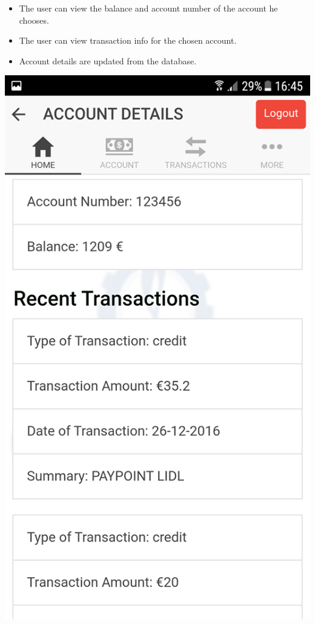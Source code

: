 \begin{itemize}
\begin{enumerate}
\begin{itemize}
                \item The user can view the balance and account number of the account he chooses.
                \item The user can view transaction info for the chosen account.
                \item Account details are updated from the database.
            \end{itemize}
\begin{center}
    \includegraphics[scale=0.5]{img/8homepagetransactions.png}

\end{center}
\end{enumerate}
\end{itemize}
